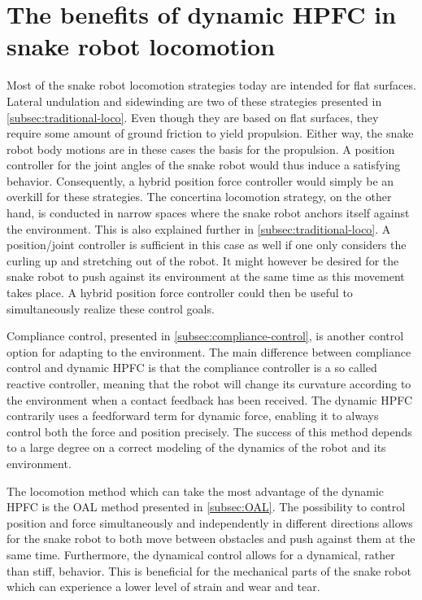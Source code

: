 \section{The benefits of dynamic HPFC in snake robot locomotion}

Most of the snake robot locomotion strategies today are intended for flat surfaces. Lateral undulation and sidewinding are two of these strategies presented in \ref{subsec:traditional-loco}. Even though they are based on flat surfaces, they require some amount of ground friction to yield propulsion. Either way, the snake robot body motions are in these cases the basis for the propulsion. A position controller for the joint angles of the snake robot would thus induce a satisfying behavior. Consequently, a hybrid position force controller would simply be an overkill for these strategies. The concertina locomotion strategy, on the other hand, is conducted in narrow spaces where the snake robot anchors itself against the environment. This is also explained further in \ref{subsec:traditional-loco}. A position/joint controller is sufficient in this case as well if one only considers the curling up and stretching out of the robot. It might however be desired for the snake robot to push against its environment at the same time as this movement takes place. A hybrid position force controller could then be useful to simultaneously realize these control goals.

Compliance control, presented in \ref{subsec:compliance-control}, is another control option for adapting to the environment. The main difference between compliance control and dynamic HPFC is that the compliance controller is a so called reactive controller, meaning that the robot will change its curvature according to the environment when a contact feedback has been received. The dynamic HPFC contrarily uses a feedforward term for dynamic force, enabling it to always control both the force and position precisely. The success of this method depends to a large degree on a correct modeling of the dynamics of the robot and its environment.

The locomotion method which can take the most advantage of the dynamic HPFC is the OAL method presented in \ref{subsec:OAL}. The possibility to control position and force simultaneously and independently in different directions allows for the snake robot to both move between obstacles and push against them at the same time. Furthermore, the dynamical control allows for a dynamical, rather than stiff, behavior. This is beneficial for the mechanical parts of the snake robot which can experience a lower level of strain and wear and tear. 


